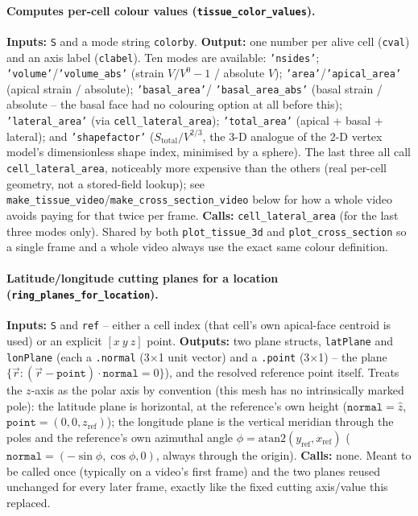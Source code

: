 \documentclass[11pt,a4paper]{report}
\begin{document}
\paragraph{Computes per-cell colour values (\texttt{tissue\_color\_values}).}
\textbf{Inputs:} \texttt{S} and a mode string \texttt{colorby}.
\textbf{Output:} one number per alive cell (\texttt{cval}) and an axis
label (\texttt{clabel}). Ten modes are available:
\texttt{'nsides'}; \texttt{'volume'}/\texttt{'volume\_abs'} (strain
$V/V^0-1$ / absolute $V$); \texttt{'area'}/\texttt{'apical\_area'}
(apical strain / absolute); \texttt{'basal\_area'}/
\texttt{'basal\_area\_abs'} (basal strain / absolute -- the basal face
had no colouring option at all before this); \texttt{'lateral\_area'}
(via \texttt{cell\_lateral\_area}); \texttt{'total\_area'} (apical +
basal + lateral); and \texttt{'shapefactor'}
($S_{\mathrm{total}}/V^{2/3}$, the 3-D analogue of the 2-D vertex
model's dimensionless shape index, minimised by a sphere). The last
three all call \texttt{cell\_lateral\_area}, noticeably more expensive
than the others (real per-cell geometry, not a stored-field lookup);
see \texttt{make\_tissue\_video}/\texttt{make\_cross\_section\_video}
below for how a whole video avoids paying for that twice per frame.
\textbf{Calls:} \texttt{cell\_lateral\_area} (for the last three modes
only). Shared by both \texttt{plot\_tissue\_3d} and
\texttt{plot\_cross\_section} so a single frame and a whole video
always use the exact same colour definition.
\paragraph{Latitude/longitude cutting planes for a location
(\texttt{ring\_planes\_for\_location}).}
\label{sec:ring-planes}
\textbf{Inputs:} \texttt{S} and \texttt{ref} -- either a cell index
(that cell's own apical-face centroid is used) or an explicit
$[x\ y\ z]$ point. \textbf{Outputs:} two plane structs,
\texttt{latPlane} and \texttt{lonPlane} (each a \texttt{.normal}
(3$\times$1 unit vector) and a \texttt{.point} (3$\times$1) -- the
plane $\{\vec r : (\vec r-\texttt{point})\cdot\texttt{normal}=0\}$),
and the resolved reference point itself. Treats the $z$-axis as the
polar axis by convention (this mesh has no intrinsically marked
pole): the latitude plane is horizontal, at the reference's own
height ($\texttt{normal}=\hat z$, $\texttt{point}=(0,0,z_{\mathrm{ref}})$);
the longitude plane is the vertical meridian through the poles and the
reference's own azimuthal angle $\phi=\mathrm{atan2}(y_{\mathrm{ref}},x_{\mathrm{ref}})$
($\texttt{normal}=(-\sin\phi,\cos\phi,0)$, always through the origin).
\textbf{Calls:} none. Meant to be called once (typically on a video's
first frame) and the two planes reused unchanged for every later
frame, exactly like the fixed cutting axis/value this replaced.
\end{document}

